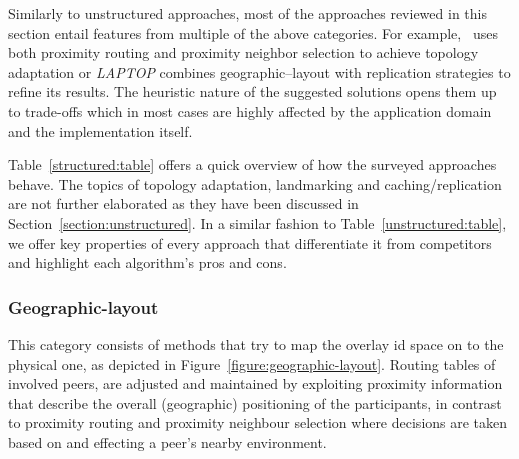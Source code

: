 Similarly to unstructured approaches, most of the approaches 
reviewed in this section entail features from multiple of the above categories. 
For example, \cite{KLKP2008}~uses both proximity routing 
and proximity neighbor selection to achieve topology adaptation 
or \emph{LAPTOP} combines geographic--layout with
replication strategies to refine its results. 
The heuristic nature of the suggested solutions opens them up 
to trade-offs which in most cases are 
highly affected by the application domain and the implementation itself.

Table~\ref{structured:table} offers a quick overview of how the surveyed 
approaches behave.  
The topics of topology adaptation, landmarking and caching/replication
are not further elaborated as they have been discussed 
in Section~\ref{section:unstructured}.
In a similar fashion to Table~\ref{unstructured:table}, we offer 
key properties of every approach 
that differentiate it from competitors and
highlight each algorithm's pros and cons.

\subsubsection{Geographic-layout} \label{section:geographic_layout}


This category consists of methods that try to map the overlay id space on to
the physical one, as depicted in Figure~\ref{figure:geographic-layout}.
Routing tables of involved peers, are adjusted and maintained by exploiting
proximity information that describe the overall (geographic) positioning of
the participants, in contrast to proximity routing and proximity neighbour
selection where decisions are taken based on and effecting a peer's nearby
environment.


